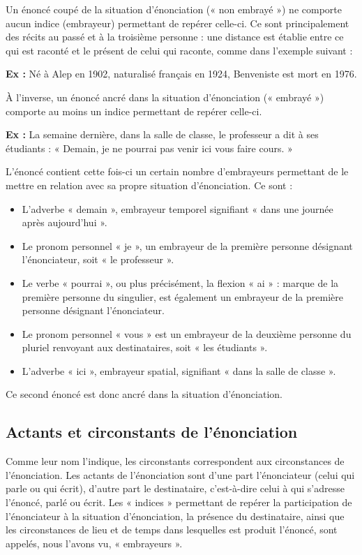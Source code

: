 Un énoncé coupé de la situation d’énonciation (« non embrayé ») ne comporte aucun indice (embrayeur) permettant de repérer celle-ci. Ce sont principalement des récits au passé et à la troisième personne : une distance est établie entre ce qui est raconté et le présent de celui qui raconte, comme dans l’exemple suivant :

\textbf{Ex :} Né à Alep en 1902, naturalisé français en 1924, Benveniste est mort en 1976.

À l’inverse, un énoncé ancré dans la situation d’énonciation (« embrayé ») comporte au moins un indice permettant de repérer celle-ci.

\textbf{Ex :} La semaine dernière, dans la salle de classe, le professeur a dit à ses étudiants : « Demain, je ne pourrai pas venir ici vous faire cours. »

L’énoncé contient cette fois-ci un certain nombre d’embrayeurs permettant de le mettre en relation avec sa propre situation d’énonciation. Ce sont :
\begin{itemize}
\item L’adverbe « demain », embrayeur temporel signifiant « dans une journée après aujourd’hui ».
\item Le pronom personnel « je », un embrayeur de la première personne désignant l’énonciateur, soit « le professeur ».
\item Le verbe « pourrai », ou plus précisément, la flexion « ai » : marque de la première personne du singulier, est également un embrayeur de la première personne désignant l’énonciateur.
\item Le pronom personnel « vous » est un embrayeur de la deuxième personne du pluriel renvoyant aux destinataires, soit « les étudiants ».
\item L’adverbe « ici », embrayeur spatial, signifiant « dans la salle de classe ».
\end{itemize}

Ce second énoncé est donc ancré dans la situation d’énonciation.

\subsection{Actants et circonstants de l’énonciation}
Comme leur nom l’indique, les circonstants correspondent aux circonstances de l’énonciation. Les actants de l’énonciation sont d’une part l’énonciateur (celui qui parle ou qui écrit), d’autre part le destinataire, c’est-à-dire celui à qui s’adresse l’énoncé, parlé ou écrit. Les « indices » permettant de repérer la participation de l’énonciateur à la situation d’énonciation, la présence du destinataire, ainsi que les circonstances de lieu et de temps dans lesquelles est produit l’énoncé, sont appelés, nous l’avons vu, « embrayeurs ».

